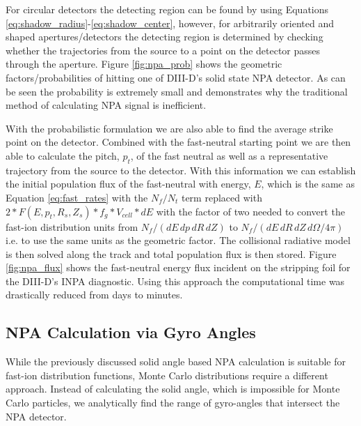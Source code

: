 For circular detectors the detecting region can be found by using Equations \ref{eq:shadow_radius}-\ref{eq:shadow_center}, however, for arbitrarily oriented and shaped apertures/detectors the detecting region is determined by checking whether the trajectories from the source to a point on the detector passes through the aperture.
Figure \ref{fig:npa_prob} shows the geometric factors/probabilities of hitting one of DIII-D's solid state NPA detector. As can be seen the probability is extremely small and demonstrates why the traditional method of calculating NPA signal is inefficient. 

With the probabilistic formulation we are also able to find the average strike point on the detector. Combined with the fast-neutral starting point we are then able to calculate the pitch, $p_t$, of the fast neutral as well as a representative trajectory from the source to the detector. With this information we can establish the initial population flux of the fast-neutral with energy, $E$, which is the same as Equation \ref{eq:fast_rates} with the $N_f/N_t$ term replaced with $2*F(E,p_t,R_s,Z_s)*f_g*V_{cell}*dE$ with the factor of two needed to convert the fast-ion distribution units from $N_f/(dE\,dp\,dR\,dZ)$ to $N_f/(dE\,dR\,dZ\,d\Omega/4\pi)$ i.e. to use the same units as the geometric factor. The collisional radiative model is then solved along the track and total population flux is then stored. Figure \ref{fig:npa_flux} shows the fast-neutral energy flux incident on the stripping foil for the DIII-D's INPA diagnostic. Using this approach the computational time was drastically reduced from days to minutes.

\subsection{NPA Calculation via Gyro Angles}
While the previously discussed solid angle based NPA calculation is suitable for fast-ion distribution functions, Monte Carlo distributions require a different approach. Instead of calculating the solid angle, which is impossible for Monte Carlo particles, we analytically find the range of gyro-angles that intersect the NPA detector. 

